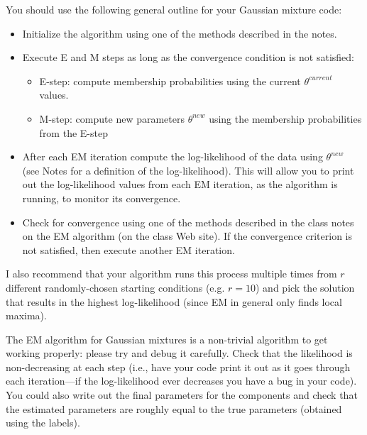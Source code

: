 \documentclass[11pt]{article}
\begin{document}
You should use the following general outline
for your Gaussian mixture code:
\begin{itemize}
\item Initialize the algorithm using one of the methods described in the notes.
\item Execute E and M steps as long as the convergence condition is not satisfied:
\begin{itemize}
\item E-step: compute membership probabilities using the current
$\theta^{current}$ values.  
\item M-step: compute new parameters $\theta^{new}$
using the membership probabilities from the E-step 
\end{itemize}
\item After each EM iteration compute the log-likelihood of the data using $\theta^{new}$ (see Notes for a definition of the log-likelihood).  This will allow you to  print   out the log-likelihood values from each EM iteration, as the algorithm is running, to monitor its convergence.
\item Check for convergence using one of the methods described in the class notes
on the EM algorithm (on the class Web site).  If the convergence criterion is not satisfied, then execute another EM iteration. 
\end{itemize}


I also recommend that your algorithm runs this process multiple times from $r$ different
randomly-chosen starting conditions (e.g. $r=10$) and pick the solution
that results in the highest log-likelihood (since EM in general only finds local maxima).  
 

 


The EM algorithm for Gaussian mixtures is a non-trivial algorithm to get working properly: please try and debug
it carefully. Check that the likelihood is non-decreasing at each step (i.e.,
have your code print it out as it goes through each iteration---if the
log-likelihood ever decreases you have a bug in your code). You could also
 write out the final parameters for the components and check that
the estimated parameters are roughly equal to the true parameters (obtained using the labels). 
\end{document}
